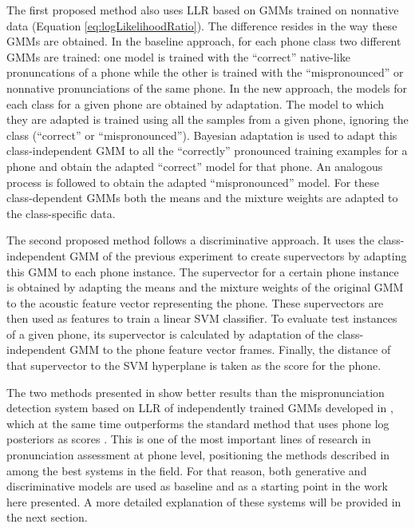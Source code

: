 The first proposed method also uses LLR based on GMMs trained
on nonnative data (Equation \ref{eq:logLikelihoodRatio}). The difference resides in the way these GMMs are obtained.
In the baseline approach, for each phone class two different GMMs are trained: one model is
trained with the ``correct'' native-like pronuncations of a phone while the other is trained
with the ``mispronounced'' or nonnative pronunciations of the same phone. In the new approach,
the models for each class for a given phone are obtained by adaptation. The model to which they
are adapted is trained using all the samples from a given phone, ignoring the class (``correct''
or ``mispronounced''). Bayesian adaptation \cite{ubm} is used to adapt this class-independent
GMM to all the ``correctly'' pronounced training examples for a phone and obtain the adapted
``correct'' model for that phone. An analogous process is followed to obtain the adapted
``mispronounced'' model. For these class-dependent GMMs both the means and the mixture weights
are adapted to the class-specific data.

The second proposed method follows a discriminative approach. It uses the class-independent
GMM of the previous experiment to create supervectors by adapting this GMM to each phone instance.
The supervector for a certain phone instance is obtained by adapting the means and the mixture
weights of the original GMM to the acoustic feature vector representing the phone.
These supervectors are then used as features to train a linear SVM classifier.
To evaluate test instances of a given phone, its supervector is calculated by adaptation of the class-independent
GMM to the phone feature vector frames. Finally, the distance of that supervector to the SVM
hyperplane is taken as the score for the phone.

The two methods presented in \cite{main} show better results than the mispronunciation
detection system based on LLR of independently trained GMMs developed in
\cite{detection_phone_level_mispronunciation_learning}, which at the same time
outperforms the standard method that uses phone log posteriors
as scores \cite{pronunciation_scoring_phone_segments_instruction}.
This is one of the most important lines of research in pronunciation assessment
at phone level, positioning the methods described in \cite{main} among the best
systems in the field. For that reason, both generative and discriminative models are
used as baseline and as a starting point in the work here presented. A more detailed
explanation of these systems will be provided in the next section.
